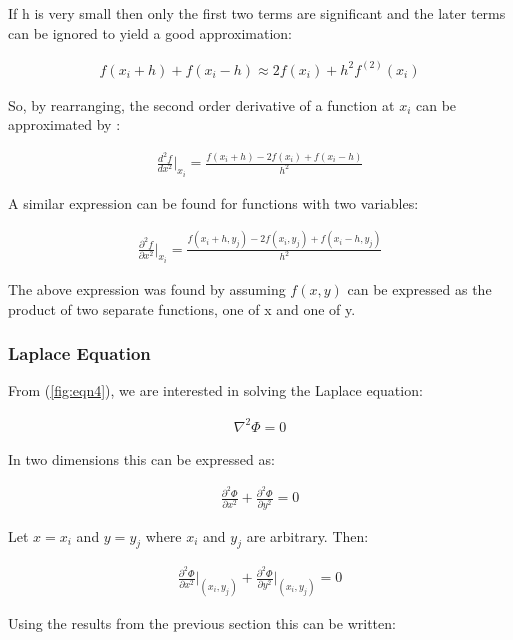\documentclass[aps,twocolumn,pre,nofootinbib,10pt]{revtex4-1}
\begin{document}
If h is very small then only the first two terms are significant and the later terms can be ignored to yield a good approximation:

\begin{gather*}
f(x_i+h)+f(x_i-h) \approx 2f(x_i) + h^2f^{(2)}(x_i)
\end{gather*}

So, by rearranging, the second order derivative of a function at \(x_i\) can be approximated by \cite{math_meth}:

\begin{gather*}
\frac{d^2f}{dx^2}\Bigg|_{x_i} = \frac{f(x_i+h)-2f(x_i)+f(x_i-h)}{h^2}
\end{gather*}

A similar expression can be found for functions with two variables:

\begin{gather*}
\frac{\partial^2f}{\partial x^2}\Bigg|_{x_i} = \frac{f(x_i+h,y_j)-2f(x_i,y_j)+f(x_i-h,y_j)}{h^2}
\end{gather*}

The above expression was found by assuming $f(x,y)$ can be expressed as the product of two separate functions, one of x and one of y. \\


\subsubsection{Laplace Equation}

From (\ref{fig:eqn4}), we are interested in solving the Laplace equation:

\begin{gather*}
\nabla^2\Phi = 0
\end{gather*}

In two dimensions this can be expressed as:

\begin{gather*}
\frac{\partial^2\Phi}{\partial x^2} + \frac{\partial^2\Phi}{\partial y^2} = 0
\end{gather*}

Let \(x=x_i\) and \(y=y_j\) where \(x_i\) and \(y_j\) are arbitrary. Then:

\begin{gather*}
\frac{\partial^2\Phi}{\partial x^2}\Bigg|_{(x_{i},y_{j})} + \frac{\partial^2\Phi}{\partial y^2}\Bigg|_{(x_{i},y_{j})} = 0
\end{gather*}

Using the results from the previous section this can be written:
\end{document}
